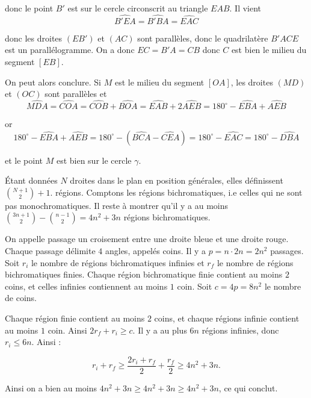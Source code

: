 \begin{sol}
donc le point $B'$ est sur le cercle circonscrit au triangle $EAB$. Il vient
$$\widehat{B'EA}=\widehat{B'BA}=\widehat{EAC}$$

donc les droites $(EB')$ et $(AC)$ sont parallèles, donc le quadrilatère $B'ACE$ est un parallélogramme. On a donc $EC=B'A=CB$ donc $C$ est bien le milieu du segment $[EB]$.

On peut alors conclure. Si $M$ est le milieu du segment $[OA]$, les droites $(MD)$ et $(OC)$ sont parallèles et 
$$\widehat{MDA}=\widehat{COA}=\widehat{COB}+\widehat{BOA}=\widehat{EAB}+2\widehat{AEB}= 180^\circ-\widehat{EBA}+\widehat{AEB}$$

or
$$180^\circ-\widehat{EBA}+\widehat{AEB}= 180^\circ-(\widehat{BCA}-\widehat{CEA})= 180^\circ- \widehat{EAC}= 180^\circ-\widehat{DBA}$$

et le point $M$ est bien sur le cercle $\gamma$.
\end{sol}


\begin{sol}
Étant données $N$ droites dans le plan en position générales, elles définissent $\binom{N+1}{2}+1$. régions. Comptons les régions bichromatiques, i.e celles qui ne sont pas monochromatiques. Il reste à montrer qu'il y a au moins $\binom{3n+1}{2}-\binom{n-1}{2}=4n^2+3n$ régions bichromatiques.

\medskip

On appelle passage un croisement entre une droite bleue et une droite rouge. Chaque passage délimite $4$ angles, appelés coins. Il y a $p = n \cdot 2n = 2n^2$ passages. Soit $r_i$ le nombre de régions bichromatiques infinies et $r_f$ le nombre de régions bichromatiques finies. Chaque région bichromatique finie contient au moins $2$ coins, et celles infinies contiennent au moins $1$ coin. Soit $c=4p=8n^2$ le nombre de coins. 

\medskip

Chaque région finie contient au moins $2$ coins, et chaque régions infinie contient au moins $1$ coin. Ainsi $2r_f+r_i\ge c$. Il y a au plus $6n$ régions infinies, donc $r_i\le 6n$. Ainsi :

$$r_i+r_f\ge \frac{2r_i+r_f}{2}+\frac{r_f}{2}\ge 4n^2+3n.$$

Ainsi on a bien au moins $4n^2+3n\ge 4n^2+3n\ge 4n^2+3n$, ce qui conclut.
\end{sol}